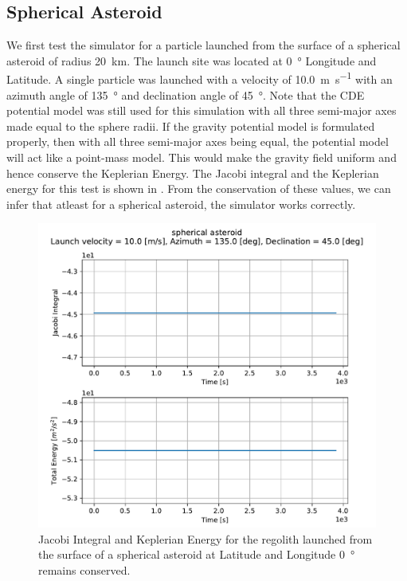\subsection{Spherical Asteroid}
\label{subsec:spherical_asteroid__orbital_mech_vv}
We first test the simulator for a particle launched from the surface of a spherical asteroid of radius \SI{20}{\kilo \metre}. The launch site was located at \SI{0}{\degree} Longitude and Latitude. A single particle was launched with a velocity of \SI{10.0}{\metre \per \second} with an azimuth angle of \SI{135}{\degree} and declination angle of \SI{45}{\degree}. Note that the \gls{CDE} potential model was still used for this simulation with all three semi-major axes made equal to the sphere radii. If the gravity potential model is formulated properly, then with all three semi-major axes being equal, the potential model will act like a point-mass model. This would make the gravity field uniform and hence conserve the Keplerian Energy. The Jacobi integral and the Keplerian energy for this test is shown in . From the conservation of these values, we can infer that atleast for a spherical asteroid, the simulator works correctly.
\begin{figure}[htb]
\centering
\captionsetup{justification=centering}
\includegraphics[width=\textwidth, height=0.5\textheight, keepaspectratio=true]{Images/spherical_asteroid_jacobi_energy.pdf}
\caption{Jacobi Integral and Keplerian Energy for the regolith launched from the surface of a spherical asteroid at Latitude and Longitude \SI{0}{\degree} remains conserved.}
\label{fig:spherical_asteroid_jacobi_energy_vv}
\end{figure}
\FloatBarrier

